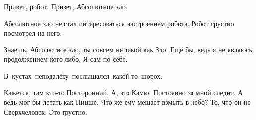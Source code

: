 \begin{dialog}
\X Привет, робот.
\R Привет, Абсолютное зло.
\end{dialog}

\begin{monolog}
Абсолютное зло не стал интересоваться настроением робота. Робот грустно посмотрел на него.
\end{monolog}

\begin{dialog}
\R Знаешь, Абсолютное зло, ты совсем не такой как Зло.
\X Ещё бы, ведь я не являюсь продолжением кого-либо. Я сам по себе.
\end{dialog}

\begin{monolog}
\mbox{В кустах неподалёку послышался какой-то шорох.}
\end{monolog}

\begin{dialog}
\R Кажется, там кто-то Посторонний.
\X А, это Камю. Постоянно за мной следит. А ведь мог бы летать как Ницше.
\R Что же ему мешает взмыть в небо?
\X То, что он не Сверхчеловек.
\R Это грустно.
\end{dialog}